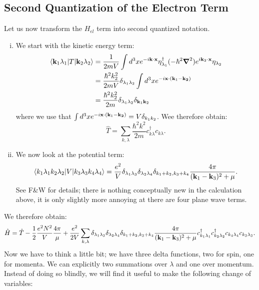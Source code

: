 \subsection{Second Quantization of the Electron Term}
Let us now transform the $H_{el}$ term into second quantized notation.
\begin{enumerate}[(i)]
    \item We start with the kinetic energy term:
    \begin{equation}
        \begin{split}
            \bra{\v{k}_1\lambda_1}T\ket{\v{k}_2\lambda_2} &= \frac{1}{2mV}\int d^3x e^{-i\v{k} \cdot \v{x}}\eta_{\lambda_1}^\dag (-\hbar^2\nabla^2)e^{i\v{k}_2\cdot \v{x}}\eta_{\lambda_2}
            \\ &= \frac{\hbar^2 k_2^2}{2mV}\delta_{\lambda_1\lambda_2}\int d^3x e^{-i\v{x} \cdot (\v{k}_1 - \v{k_2})}
            \\ &= \frac{\hbar^2k_2^2}{2m}\delta_{\lambda_1\lambda_2}\delta_{\v{k}_1\v{k}_2}
        \end{split}
    \end{equation}
    where we use that $\int d^3x e^{-i\mathbf{x} \cdot (\mathbf{k}_1 - \mathbf{k_2})} = V\delta_{k_1k_2}$. Wee therefore obtain:
    \begin{equation}
        \hat{T} = \sum_{k, \lambda}\frac{\hbar^2 k^2}{2m}c_{k\lambda}^\dag c_{k\lambda}.
    \end{equation}
    \item We now look at the potential term:
    \begin{equation}
        \langle k_1\lambda_1k_2\lambda_2 \rvert V\lvert k_3\lambda_3k_4\lambda_4 \rangle = \frac{e^2}{V}\delta_{\lambda_1\lambda_3}\delta_{\lambda_2\lambda_4}\delta_{k_1 + k_2, k_3 + k_4}\frac{4\pi}{(\mathbf{k}_1 - \mathbf{k}_3)^2 + \mu}.
    \end{equation}
    See F\&W for details; there is nothing conceptually new in the calculation above, it is only slightly more annoying at there are four plane wave terms.
\end{enumerate}
We therefore obtain:
\begin{equation}\label{eq-JelliumquantizedH}
    \hat{H} = \hat{T} - \frac{1}{2}\frac{e^2N^2}{V}\frac{4\pi}{\mu} + \frac{e^2}{2V}\sum_{k, \lambda}\delta_{\lambda_1\lambda_3}\delta_{\lambda_2\lambda_4}\delta_{k_1 + k_2, k_3 + k_4}\frac{4\pi}{(\mathbf{k}_1 - \mathbf{k}_3)^2 + \mu} c^\dagger_{k_1\lambda_1}c^\dagger_{k_2\lambda_2}c_{k_4\lambda_4}c_{k_3\lambda_3}.
\end{equation}
Now we have to think a little bit; we have three delta functions, two for spin, one for momenta. We can explicitly two summations over $\lambda$ and one over momentum. Instead of doing so blindly, we will find it useful to make the following change of variables:

